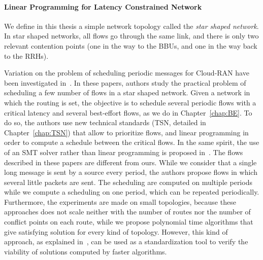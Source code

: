 \paragraph{Linear Programming for Latency Constrained Network}
We define in this thesis a simple network topology called the {\em star shaped network}. In star shaped networks, all flows go through the same link, and there is only two relevant contention points (one in the way to the BBUs, and one in the way back to the RRHs).

Variation on the problem of scheduling periodic messages for Cloud-RAN have been investigated in~\cite{nayak2017incremental,steiner2018traffic,silviu2017,naresh2016}. In these papers, authors study the practical problem of scheduling a few number of flows in a star shaped network. Given a network in which the routing is set, the objective is to schedule several periodic flows with a critical latency and several best-effort flows, as we do in Chapter~\ref{chap:BE}. To do so, the authors use new technical standards (TSN, detailed in Chapter~\ref{chap:TSN}) that allow to prioritize flows, and linear programming in order to compute a schedule between the critical flows. In the same spirit, the use of an SMT solver rather than linear programming is proposed in~\cite{dos2019tsnsched}. %
The flows described in these papers are different from ours. While we consider that a single long message is sent by a source every period, the authors propose flows in which several little packets are sent. The scheduling are computed on multiple periods while we compute a scheduling on one period, which can be repeated periodically.
Furthermore, the experiments are made on small topologies, because these approaches does not scale neither with the number of routes nor the number of conflict points on each route, while we propose polynomial time algorithms that give satisfying solution for every kind of topology. However, this kind of approach, as explained in~\cite{steiner2018traffic}, can be used as a standardization tool to verify the viability of solutions computed by faster algorithms.





